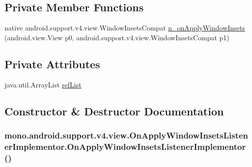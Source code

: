 \subsection*{Private Member Functions}
\begin{CompactItemize}
\item 
native android.support.v4.view.WindowInsetsCompat \hyperlink{classmono_1_1android_1_1support_1_1v4_1_1view_1_1_on_apply_window_insets_listener_implementor_a54b539cac16c8108f9ad059c8116d0d}{n\_\-onApplyWindowInsets} (android.view.View p0, android.support.v4.view.WindowInsetsCompat p1)
\end{CompactItemize}
\subsection*{Private Attributes}
\begin{CompactItemize}
\item 
java.util.ArrayList \hyperlink{classmono_1_1android_1_1support_1_1v4_1_1view_1_1_on_apply_window_insets_listener_implementor_6d168ac749230c4745461fbc2e5f846a}{refList}
\end{CompactItemize}


\subsection{Constructor \& Destructor Documentation}
\hypertarget{classmono_1_1android_1_1support_1_1v4_1_1view_1_1_on_apply_window_insets_listener_implementor_416a721655e71bb15fa0f7db52314cfd}{
\subsubsection[{OnApplyWindowInsetsListenerImplementor}]{\setlength{\rightskip}{0pt plus 5cm}mono.android.support.v4.view.OnApplyWindowInsetsListenerImplementor.OnApplyWindowInsetsListenerImplementor ()}}
\label{classmono_1_1android_1_1support_1_1v4_1_1view_1_1_on_apply_window_insets_listener_implementor_416a721655e71bb15fa0f7db52314cfd}




